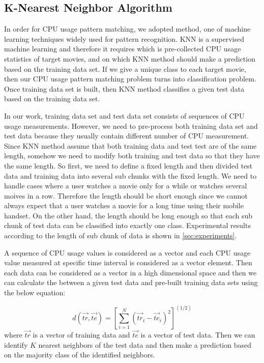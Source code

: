 \subsection{K-Nearest Neighbor Algorithm}
 
In order for CPU usage pattern matching, we adopted  method, one of machine learning techniques widely used for pattern recognition.
KNN is a supervised machine learning and therefore it requires  which is pre-collected CPU usage statistics of target movies, and  on which KNN method should make a prediction based on the training data set.
If we give a unique class to each target movie, then our CPU usage pattern matching problem turns into classification problem. 
Once training data set is built, then KNN method classifies a given test data based on the training data set. 

In our work, training data set and test data set consists of sequences of CPU usage measurements. 
However, we need to pre-process both training data set and test data because they usually contain different number of CPU measurement.
Since KNN method assume that both training data and test test are of the same length, somehow we need to modify both training and test data so that they have the same length. 
So first, we need to define a fixed length and then divided test data and training data into several sub chunks with the fixed length. 
We need to handle cases where a user watches a movie only for a while or watches several moives in a row. 
Therefore the length should be short enough since we cannot always expect that a user watches a movie for a long time using their mobile handset.  
On the other hand, the length should be long enough so that each sub chunk of test data can be classified into exactly one class. 
Experimental results according to the length of sub chunk of data is shown in \ref{sec:experiments}.

A sequence of CPU usage values is considered as a vector and each CPU usage value measured at specific time interval is considered as a vector element. 
Then each data can be considered as a vector in a high dimensional space and then we can calculate the  between a given test data and pre-built training data sets using the below equation: 

\[
d( \vec{tr}, \vec{te} ) = [ \sum_{i=1}^{N} (\vec{tr}_i - \vec{te}_i)^2  ]^{(1/2)}
\]
where $\vec{tr}$ is a vector of training data and $\vec{te}$ is a vector of test data. 
Then we can identify $K$ nearest neighbors of the test data and then make a prediction based on the majority class of the identified neighbors. 


\begin{comment}
There exist a few other machine learning methods such as \term{Support Vector Machine} or \term{Perceptron}, they have couple of drawbacks when applied to our pattern matching problem: 

(1) Features are not fixed 

Consider a sequence of CPU usage values as a vector and then KNN tries to find out k nearest vectors 
\end{comment}